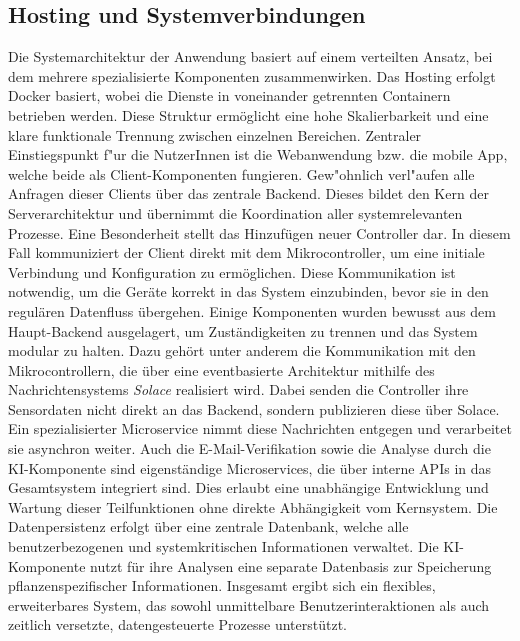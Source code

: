 \subsection{Hosting und Systemverbindungen}
Die Systemarchitektur der Anwendung basiert auf einem verteilten Ansatz, bei dem mehrere spezialisierte Komponenten zusammenwirken. Das Hosting erfolgt Docker basiert, wobei die Dienste in voneinander getrennten Containern betrieben werden. Diese Struktur ermöglicht eine hohe Skalierbarkeit und eine klare funktionale Trennung zwischen einzelnen Bereichen.
Zentraler Einstiegspunkt f"ur die NutzerInnen ist die Webanwendung bzw. die mobile App, welche beide als Client-Komponenten fungieren. Gew"ohnlich verl"aufen alle Anfragen dieser Clients über das zentrale Backend. Dieses bildet den Kern der Serverarchitektur und übernimmt die Koordination aller systemrelevanten Prozesse.
Eine Besonderheit stellt das Hinzufügen neuer Controller dar. In diesem Fall kommuniziert der Client direkt mit dem Mikrocontroller, um eine initiale Verbindung und Konfiguration zu ermöglichen. Diese Kommunikation ist notwendig, um die Geräte korrekt in das System einzubinden, bevor sie in den regulären Datenfluss übergehen.
Einige Komponenten wurden bewusst aus dem Haupt-Backend ausgelagert, um Zuständigkeiten zu trennen und das System modular zu halten. Dazu gehört unter anderem die Kommunikation mit den Mikrocontrollern, die über eine eventbasierte Architektur mithilfe des Nachrichtensystems \textit{Solace} realisiert wird. Dabei senden die Controller ihre Sensordaten nicht direkt an das Backend, sondern publizieren diese über Solace. Ein spezialisierter Microservice nimmt diese Nachrichten entgegen und verarbeitet sie asynchron weiter.
Auch die E-Mail-Verifikation sowie die Analyse durch die KI-Komponente sind eigenständige Microservices, die über interne APIs in das Gesamtsystem integriert sind. Dies erlaubt eine unabhängige Entwicklung und Wartung dieser Teilfunktionen ohne direkte Abhängigkeit vom Kernsystem.
Die Datenpersistenz erfolgt über eine zentrale Datenbank, welche alle benutzerbezogenen und systemkritischen Informationen verwaltet. Die KI-Komponente nutzt für ihre Analysen eine separate Datenbasis zur Speicherung pflanzenspezifischer Informationen.
Insgesamt ergibt sich ein flexibles, erweiterbares System, das sowohl unmittelbare Benutzerinteraktionen als auch zeitlich versetzte, datengesteuerte Prozesse unterstützt.
